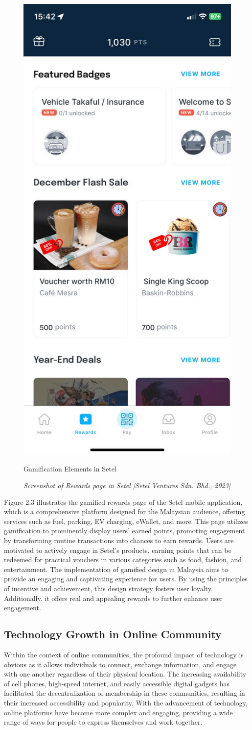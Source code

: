 \begin{figure}[h]
    \centering
    \includegraphics[width=0.35\linewidth]{mainmatter/images/gami1.jpg}
    \caption{Gamification Elements in Setel}
    \caption*{\textit{Screenshot of Rewards page in Setel [Setel Ventures Sdn. Bhd., 2023]}}
    \label{fig:myfig5}
\end{figure}
Figure 2.3 illustrates the gamified rewards page of the Setel mobile application, which is a comprehensive platform designed for the Malaysian audience, offering services such as fuel, parking, EV charging, eWallet, and more. This page utilizes gamification to prominently display users' earned points, promoting engagement by transforming routine transactions into chances to earn rewards. Users are motivated to actively engage in Setel's products, earning points that can be redeemed for practical vouchers in various categories such as food, fashion, and entertainment. The implementation of gamified design in Malaysia aims to provide an engaging and captivating experience for users. By using the principles of incentive and achievement, this design strategy fosters user loyalty. Additionally, it offers real and appealing rewards to further enhance user engagement.

\subsection{Technology Growth in Online Community}
Within the context of online communities, the profound impact of technology is obvious as it allows individuals to connect, exchange information, and engage with one another regardless of their physical location. The increasing availability of cell phones, high-speed internet, and easily accessible digital gadgets has facilitated the decentralization of membership in these communities, resulting in their increased accessibility and popularity. With the advancement of technology, online platforms have become more complex and engaging, providing a wide range of ways for people to express themselves and work together. \\

